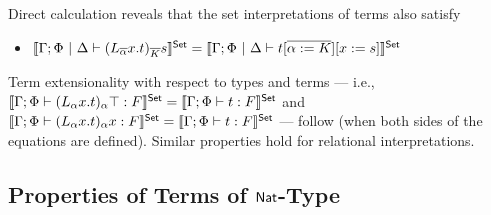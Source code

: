 \documentclass{lmcs}
\theoremstyle{plain}\newtheorem{satz}[thm]{Satz}
\begin{document}
Direct calculation reveals that the set interpretations of terms also
satisfy
\begin{itemize}
\item $\llbracket{\Gamma; \Phi~|~\Delta \vdash
  (L_{\overline{\alpha}}x.t)_{\overline{K}}s}\rrbracket^{\mathsf{Set}} = \llbracket{\Gamma; \Phi~|~\Delta
  \vdash t [\overline{\alpha := K}][x := s]}\rrbracket^{\mathsf{Set}}$
\end{itemize}
Term extensionality with respect to types and terms --- i.e.,
$\llbracket{\Gamma;\Phi\vdash (L_\alpha x.t)_\alpha \top : F}\rrbracket^{\mathsf{Set}} =
\llbracket{\Gamma;\Phi \vdash t : F}\rrbracket^{\mathsf{Set}}$ and $\llbracket{\Gamma;\Phi\vdash
  (L_\alpha x.t)_\alpha x : F}\rrbracket^{\mathsf{Set}} = \llbracket{\Gamma;\Phi \vdash t : F}\rrbracket^{\mathsf{Set}}$
--- follow (when both sides of the equations are defined). Similar
properties hold for relational interpretations.

\subsection{Properties of Terms of $\mathsf{Nat}$-Type}\label{sec:Nat-type-terms}
\end{document}
